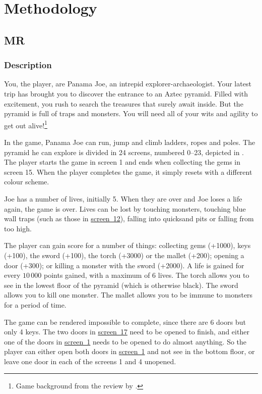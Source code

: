 \newcommand{\refscreen}[1]{\hyperref[fig:montezuma-map]{screen~#1}}
\chapter{Methodology}
\section{\acl{MR}}
\subsection{Description}
You, the player, are Panama Joe, an intrepid explorer-archaeologist. Your latest
trip has brought you to discover the entrance to an Aztec pyramid. Filled with
excitement, you rush to search the treasures that surely await inside. But the
pyramid is full of traps and monsters. You will need all of your wits and agility to
get out alive!\footnote{Game background from the review by \citet{adair2007montezuma}.}

In the game, Panama Joe can run, jump and climb ladders, ropes and poles. The
pyramid he can explore is divided in 24 screens, numbered 0--23, depicted in
. The player starts the game in screen 1 and ends when
collecting the gems in screen 15. When the player completes the game, it simply
resets with a different colour scheme.

Joe has a number of lives, initially 5. When they are over and Joe loses a life
again, the game is over. Lives can be lost by touching monsters, touching blue
wall traps (such as those in \refscreen{12}), falling
into quicksand pits or falling from too high.

The player can gain score for a number of things: collecting gems (+1000),
keys (+100), the sword (+100), the torch (+3000) or the mallet (+200); opening a
door (+300); or killing a monster with the sword (+2000). A life
is gained for every $10\,000$ points gained, with a maximum of 6 lives. The
torch allows you to see in the lowest floor of the pyramid (which is otherwise
black). The sword allows you to kill one monster. The mallet allows you to be
immune to monsters for a period of time.

The game can be rendered impossible to complete, since there are 6 doors but
only 4 keys. The two doors in \refscreen{17} need to be opened to finish, and
either one of the doors in \refscreen{1} needs to be opened to do almost
anything. So the player can either open both doors in \refscreen{1} and not see
in the bottom floor, or leave one door in each of the screens 1 and 4 unopened.

